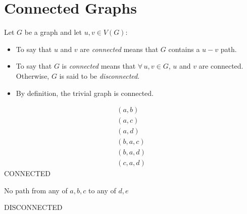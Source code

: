 \documentclass[letterpaper,12pt]{article}
\begin{document}
\section*{Connected Graphs}

\begin{definition}
  Let \(G\) be a graph and let \(u,v\in V(G)\):
  \begin{itemize}
  \item To say that \(u\) and \(v\) are \emph{connected} means that \(G\) contains a \(u-v\) path.
  \item To say that \(G\) is \emph{connected} means that \(\forall\,u,v\in G\), \(u\) and \(v\) are connected.
    Otherwise, \(G\) is said to be \emph{disconnected}.
  \item By definition, the trivial graph is connected.
  \end{itemize}
\end{definition}

\begin{examples}
  \begin{minipage}[t]{2.5in}
    \begin{center}
      \begin{gather*}
        (a,b) \\
        (a,c) \\
        (a,d) \\
        (b,a,c) \\
        (b,a,d) \\
        (c,a,d)
      \end{gather*}
      CONNECTED
    \end{center}
  \end{minipage}
  \begin{minipage}[t]{3in}
    \begin{center}

      \bigskip
      
      No path from any of \(a,b,c\) to any of \(d,e\)

      \bigskip

      DISCONNECTED
    \end{center}
  \end{minipage}
\end{examples}
\end{document}
